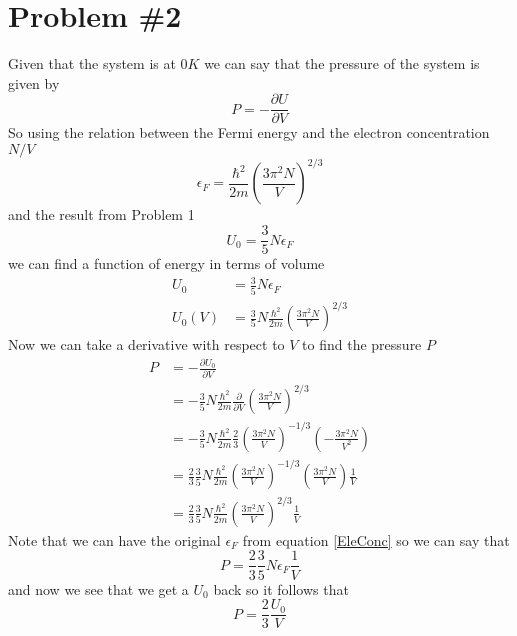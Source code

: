 \documentclass[11pt]{article}
\numberwithin{equation}{section}
\begin{document}
\section{Problem \#2}
Given that the system is at $0\unit{K}$ we can say that the pressure of the system is given by
$$P = -\frac{\partial U}{\partial V}$$
So using the relation between the Fermi energy and the electron concentration $N/V$
\begin{equation}
\epsilon_F = \frac{\hbar^2}{2m}\left(\frac{3\pi^2N}{V}\right)^{2/3}
\label{EleConc}
\end{equation}
and the result from Problem 1 
$$U_0 = \frac{3}{5}N\epsilon_F$$
we can find a function of energy in terms of volume
\begin{align*}
U_0 &= \frac{3}{5}N\epsilon_F\\
U_0(V) &= \frac{3}{5}N\frac{\hbar^2}{2m}\left(\frac{3\pi^2N}{V}\right)^{2/3}
\end{align*}
Now we can take a derivative with respect to $V$ to find the pressure $P$
\begin{align*}
P &= -\frac{\partial U_0}{\partial V}\\
&= -\frac{3}{5}N\frac{\hbar^2}{2m}\frac{\partial}{\partial V}\left(\frac{3\pi^2N}{V}\right)^{2/3}\\
&= -\frac{3}{5}N\frac{\hbar^2}{2m}\frac{2}{3}\left(\frac{3\pi^2N}{V}\right)^{-1/3}\left(-\frac{3\pi^2N}{V^2}\right)\\
&= \frac{2}{3}\frac{3}{5}N\frac{\hbar^2}{2m}\left(\frac{3\pi^2N}{V}\right)^{-1/3}\left(\frac{3\pi^2N}{V}\right)\frac{1}{V}\\
&= \frac{2}{3}\frac{3}{5}N\frac{\hbar^2}{2m}\left(\frac{3\pi^2N}{V}\right)^{2/3}\frac{1}{V}
\end{align*}
Note that we can have the original $\epsilon_F$ from equation \ref{EleConc} so we can say that
$$P= \frac{2}{3}\frac{3}{5}N\epsilon_F\frac{1}{V}$$
and now we see that we get a $U_0$ back so it follows that
$$P = \frac{2}{3}\frac{U_0}{V}$$
\end{document}
